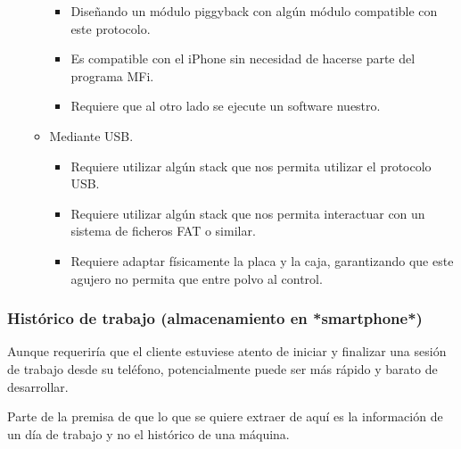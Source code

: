 \begin{enumerate}
\begin{itemize}
       \begin{itemize}
           \item Diseñando un módulo piggyback con algún módulo compatible con este protocolo.
           \item Es compatible con el iPhone sin necesidad de hacerse parte del programa MFi.
           \item Requiere que al otro lado se ejecute un software nuestro.
       \end{itemize}
       \item Mediante USB.
       \begin{itemize}
           \item Requiere utilizar algún stack que nos permita utilizar el protocolo USB.
           \item Requiere utilizar algún stack que nos permita interactuar con un sistema de ficheros FAT o similar.
           \item Requiere adaptar físicamente la placa y la caja, garantizando que este agujero no permita que entre polvo al control.
       \end{itemize}
   \end{itemize}
\end{enumerate}

\subsubsection{Histórico de trabajo (almacenamiento en *smartphone*)}

Aunque requeriría que el cliente estuviese atento de iniciar y finalizar
una sesión de trabajo desde su teléfono, potencialmente puede ser más
rápido y barato de desarrollar.

Parte de la premisa de que lo que se quiere extraer de aquí es la información
de un día de trabajo y no el histórico de una máquina.

